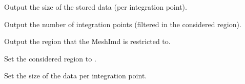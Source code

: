 \documentclass[a4paper,11pt,english]{sphinxmanual}
\begin{document}
\begin{fulllineitems}

\begin{fulllineitems}
\label{\detokenize{python/cmdref_MeshImData:getfem.MeshImData.nb_tensor_elements}}
Output the size of the stored data (per integration point).

\end{fulllineitems}


\begin{fulllineitems}
\label{\detokenize{python/cmdref_MeshImData:getfem.MeshImData.nbpts}}
Output the number of integration points (filtered in the considered region).

\end{fulllineitems}


\begin{fulllineitems}
\label{\detokenize{python/cmdref_MeshImData:getfem.MeshImData.region}}
Output the region that the MeshImd is restricted to.

\end{fulllineitems}


\begin{fulllineitems}
\label{\detokenize{python/cmdref_MeshImData:getfem.MeshImData.set_region}}
Set the considered region to .

\end{fulllineitems}


\begin{fulllineitems}
\label{\detokenize{python/cmdref_MeshImData:getfem.MeshImData.set_tensor_size}}
Set the size of the data per integration point.


\end{fulllineitems}
\end{fulllineitems}
\end{document}
